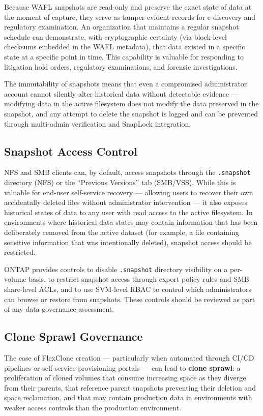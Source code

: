 \begin{securitybox}
Because WAFL snapshots are read-only and preserve the exact state of data at the moment of capture, they serve as tamper-evident records for e-discovery and regulatory examination. An organization that maintains a regular snapshot schedule can demonstrate, with cryptographic certainty (via block-level checksums embedded in the WAFL metadata), that data existed in a specific state at a specific point in time. This capability is valuable for responding to litigation hold orders, regulatory examinations, and forensic investigations.

The immutability of snapshots means that even a compromised administrator account cannot silently alter historical data without detectable evidence --- modifying data in the active filesystem does not modify the data preserved in the snapshot, and any attempt to delete the snapshot is logged and can be prevented through multi-admin verification and SnapLock integration.

\subsection*{Snapshot Access Control}

NFS and SMB clients can, by default, access snapshots through the \texttt{.snapshot} directory (NFS) or the ``Previous Versions'' tab (SMB/VSS). While this is valuable for end-user self-service recovery --- allowing users to recover their own accidentally deleted files without administrator intervention --- it also exposes historical states of data to any user with read access to the active filesystem. In environments where historical data states may contain information that has been deliberately removed from the active dataset (for example, a file containing sensitive information that was intentionally deleted), snapshot access should be restricted.

ONTAP provides controls to disable \texttt{.snapshot} directory visibility on a per-volume basis, to restrict snapshot access through export policy rules and SMB share-level ACLs, and to use SVM-level RBAC to control which administrators can browse or restore from snapshots. These controls should be reviewed as part of any data governance assessment.

\subsection*{Clone Sprawl Governance}

The ease of FlexClone creation --- particularly when automated through CI/CD pipelines or self-service provisioning portals --- can lead to \textbf{clone sprawl}: a proliferation of cloned volumes that consume increasing space as they diverge from their parents, that reference parent snapshots preventing their deletion and space reclamation, and that may contain production data in environments with weaker access controls than the production environment.


\end{securitybox}
